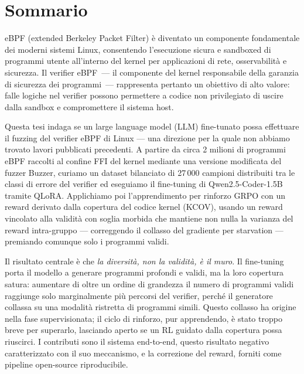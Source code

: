 
\chapter*{Sommario}

eBPF (extended Berkeley Packet Filter) è diventato un componente fondamentale
dei moderni sistemi Linux, consentendo l'esecuzione sicura e sandboxed di programmi
utente all'interno del kernel per applicazioni di rete, osservabilità e sicurezza.
Il verifier eBPF~--- il componente del kernel responsabile della garanzia di
sicurezza dei programmi~--- rappresenta pertanto un obiettivo di alto valore:
falle logiche nel verifier possono permettere a codice non privilegiato di uscire
dalla sandbox e compromettere il sistema host.

Questa tesi indaga se un large language model (LLM) fine-tunato possa effettuare il
fuzzing del verifier eBPF di Linux --- una direzione per la quale non abbiamo
trovato lavori pubblicati precedenti. A partire da circa 2 milioni di programmi
eBPF raccolti al confine FFI del kernel mediante una versione modificata del fuzzer
Buzzer, curiamo un dataset bilanciato di 27\,000 campioni distribuiti tra le classi
di errore del verifier ed eseguiamo il fine-tuning di Qwen2.5-Coder-1.5B tramite
QLoRA. Applichiamo poi l'apprendimento per rinforzo GRPO con un reward derivato
dalla copertura del codice kernel (KCOV), usando un reward vincolato alla validità
con soglia morbida che mantiene non nulla la varianza del reward intra-gruppo
--- correggendo il collasso del gradiente per starvation --- premiando comunque
solo i programmi validi.

Il risultato centrale è che \emph{la diversità, non la validità, è il muro}.
Il fine-tuning porta il modello a generare programmi profondi e validi, ma la loro
copertura satura: aumentare di oltre un ordine di grandezza il numero di programmi
validi raggiunge solo marginalmente più percorsi del verifier, perché il generatore
collassa su una modalità ristretta di programmi simili. Questo collasso ha origine
nella fase supervisionata; il ciclo di rinforzo, pur apprendendo, è stato troppo
breve per superarlo, lasciando aperto se un RL guidato dalla copertura possa
riuscirci. I contributi sono il sistema end-to-end, questo risultato negativo
caratterizzato con il suo meccanismo, e la correzione del reward, forniti come
pipeline open-source riproducibile.

